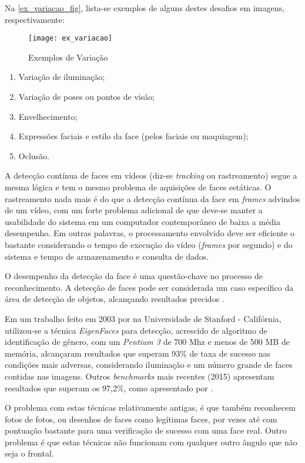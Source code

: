 Na \autoref{ex_variacao_fig}, lista-se exemplos de alguns destes desafios em imagens, respectivamente:

\begin{figure}[h]
	\centering
	\texttt{[image: ex\_variacao]}
	\caption{Exemplos de Variação}
	\label{ex_variacao_fig}
\end{figure}


\begin{enumerate}[label=(\alph*)]
	\item Variação de iluminação;
	\item Variação de poses ou pontos de visão;
	\item Envelhecimento;
	\item Expressões faciais e estilo da face (pelos faciais ou maquiagem);
	\item Oclusão.
\end{enumerate}


A detecção contínua de faces em vídeos (diz-se \textit{tracking} ou rastreamento) segue a mesma lógica e tem o mesmo problema de aquisições de faces estáticas. O rastreamento nada mais é do que a detecção contínua da face em \textit{frames} advindos de um vídeo, com um forte problema adicional de que deve-se manter a usabilidade do sistema em um computador contemporâneo de baixa a média desempenho. Em outras palavras, o processamento envolvido deve ser eficiente o bastante considerando o tempo de execução do vídeo (\textit{frames} por segundo) e do sistema e tempo de armazenamento e consulta de dados.

O desempenho da detecção da face é uma questão-chave no processo de reconhecimento. A detecção de faces pode ser considerada um caso específico da área de detecção de objetos, alcançando resultados precidos \cite{stats_face_detection_IEEE}.

Em um trabalho feito em 2003 por  na Universidade de Stanford - Califórnia, utilizou-se a técnica \textit{EigenFaces} para detecção, acrescido de algoritmo de identificação de gênero, com um \textit{Pentium 3} de 700 Mhz e menos de 500 MB de memória, alcançaram resultados que superam 93\% de taxa de sucesso nas condições mais adversas, considerando iluminação e um número grande de faces contidas nas imagens. Outros \textit{benchmarks} mais recentes (2015) apresentam resultados que superam os 97,2\%, como apresentado por \cite{stats_hong_kong}.

O problema com estas técnicas relativamente antigas, é que também reconhecem fotos de fotos, ou desenhos de faces como legítimas faces, por vezes até com pontuação bastante para uma verificação de sucesso com uma face real. Outro problema é que estas técnicas não funcionam com qualquer outro ângulo que não seja o frontal.

